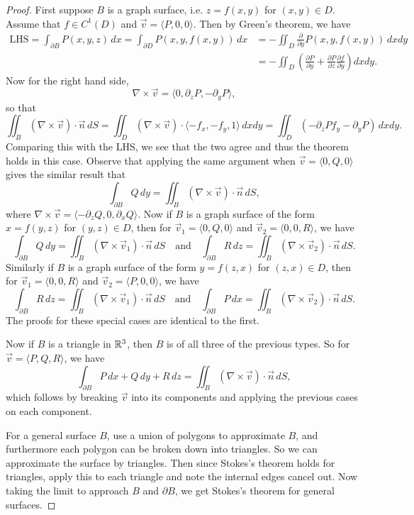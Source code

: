 \begin{proof}
  First suppose $B$ is a graph surface, i.e.
  $z = f(x, y)$ for $(x, y) \in D$. Assume that
  $f \in C^1(D)$ and
  $\vec{v} = \langle P, 0, 0 \rangle$. Then by Green's
  theorem, we have
  \begin{align*}
    \text{LHS}
    = \int_{\partial B} P(x, y, z)\, dx
    = \int_{\partial D} P(x, y, f(x, y))\, dx
    &= - \iint_D \frac{\partial}{\partial y} P(x, y, f(x, y))\, dxdy \\
    &= -\iint_D \left(\frac{\partial P}{\partial y} + \frac{\partial P}{\partial z} \frac{\partial f}{\partial y}\right) dxdy.
  \end{align*}
  Now for the right hand side,
  \[
    \nabla \times \vec{v} = \langle 0, \partial_z P, - \partial_y P \rangle,
  \]
  so that
  \[
    \iint_B (\nabla \times \vec{v}) \cdot \vec{n} \, dS
    = \iint_D (\nabla \times \vec{v}) \cdot \langle -f_x, -f_y, 1 \rangle \, dxdy
    = \iint_D (-\partial_z P f_y - \partial_y P)\, dxdy.
  \]
  Comparing this with the LHS, we see that the two agree
  and thus the theorem holds in this case.
  Observe that applying the same argument when
  $\vec{v} = \langle 0, Q, 0 \rangle$ gives the similar
  result that
  \[
    \int_{\partial B} Q\, dy
    = \iint_B (\nabla \times \vec{v}) \cdot \vec{n} \, dS,
  \]
  where $\nabla \times \vec{v} = \langle -\partial_z Q, 0, \partial_x Q \rangle$.
  Now if $B$ is a graph surface of the form
  $x = f(y, z)$ for $(y, z) \in D$, then for
  $\vec{v}_1 = \langle 0, Q, 0 \rangle$ and
  $\vec{v}_2 = \langle 0, 0, R \rangle$, we have
  \[
    \int_{\partial B} Q\, dy
    = \iint_B (\nabla \times \vec{v}_1) \cdot \vec{n} \, dS
    \quad \text{and} \quad
    \int_{\partial B} R\, dz
    = \iint_B (\nabla \times \vec{v}_2) \cdot \vec{n} \, dS.
  \]
  Similarly if $B$ is a graph surface of the form
  $y = f(z, x)$  for $(z, x) \in D$, then for
  $\vec{v}_1 = \langle 0, 0, R \rangle$ and
  $\vec{v}_2 = \langle P, 0, 0 \rangle$, we have
  \[
    \int_{\partial B} R\, dz
    = \iint_B (\nabla \times \vec{v}_1) \cdot \vec{n} \, dS
    \quad \text{and} \quad
    \int_{\partial B} P\, dx
    = \iint_B (\nabla \times \vec{v}_2) \cdot \vec{n} \, dS.
  \]
  The proofs for these special cases are identical to
  the first.

  Now if $B$ is a triangle in $\mathbb{R}^3$, then $B$ is
  of all three of the previous types. So for
  $\vec{v} = \langle P, Q, R \rangle$, we have
  \[
    \int_{\partial B} P\, dx + Q\, dy + R\, dz
    = \iint_B (\nabla \times \vec{v}) \cdot \vec{n} \, dS,
  \]
  which follows by breaking $\vec{v}$ into its components
  and applying the previous cases on each component.

  For a general surface $B$, use a union of polygons
  to approximate $B$, and furthermore each polygon
  can be broken down into triangles. So we can approximate
  the surface by triangles. Then since Stokes's theorem
  holds for triangles, apply this to each triangle
  and note the internal edges cancel out. Now taking
  the limit to approach $B$ and $\partial B$, we
  get Stokes's theorem for general surfaces.
\end{proof}


